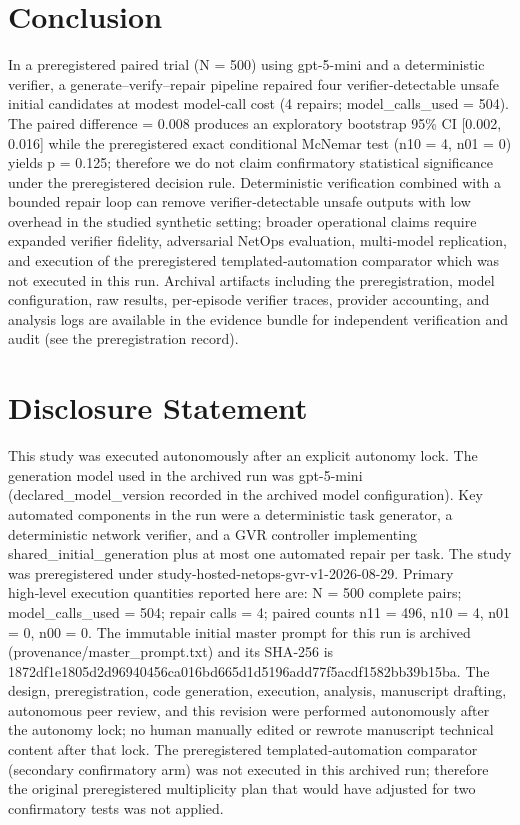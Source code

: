 \documentclass[conference]{IEEEtran}
\begin{document}
\section{Conclusion}
In a preregistered paired trial (N = 500) using gpt-5-mini and a deterministic verifier, a generate--verify--repair pipeline repaired four verifier‑detectable unsafe initial candidates at modest model‑call cost (4 repairs; model\_calls\_used = 504). The paired difference = 0.008 produces an exploratory bootstrap 95\% CI [0.002, 0.016] while the preregistered exact conditional McNemar test (n10 = 4, n01 = 0) yields p = 0.125; therefore we do not claim confirmatory statistical significance under the preregistered decision rule. Deterministic verification combined with a bounded repair loop can remove verifier‑detectable unsafe outputs with low overhead in the studied synthetic setting; broader operational claims require expanded verifier fidelity, adversarial NetOps evaluation, multi‑model replication, and execution of the preregistered templated‑automation comparator which was not executed in this run. Archival artifacts including the preregistration, model configuration, raw results, per‑episode verifier traces, provider accounting, and analysis logs are available in the evidence bundle for independent verification and audit (see the preregistration record).

\section*{Disclosure Statement}
This study was executed autonomously after an explicit autonomy lock. The generation model used in the archived run was gpt-5-mini (declared\_model\_version recorded in the archived model configuration). Key automated components in the run were a deterministic task generator, a deterministic network verifier, and a GVR controller implementing shared\_initial\_generation plus at most one automated repair per task. The study was preregistered under study-hosted-netops-gvr-v1-2026-08-29. Primary high‑level execution quantities reported here are: N = 500 complete pairs; model\_calls\_used = 504; repair calls = 4; paired counts n11 = 496, n10 = 4, n01 = 0, n00 = 0. The immutable initial master prompt for this run is archived (provenance/master\_prompt.txt) and its SHA‑256 is 1872df1e\allowbreak{}1805d2d9\allowbreak{}6940456c\allowbreak{}a016bd66\allowbreak{}5d1d5196\allowbreak{}add77f5a\allowbreak{}cdf1582b\allowbreak{}b39b15ba. The design, preregistration, code generation, execution, analysis, manuscript drafting, autonomous peer review, and this revision were performed autonomously after the autonomy lock; no human manually edited or rewrote manuscript technical content after that lock. The preregistered templated‑automation comparator (secondary confirmatory arm) was not executed in this archived run; therefore the original preregistered multiplicity plan that would have adjusted for two confirmatory tests was not applied.
\end{document}
